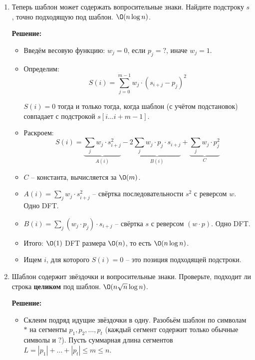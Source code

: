\begin{enumerate}
\begin{enumerate}
      \item
        Теперь шаблон может содержать вопросительные знаки. Найдите подстроку $s$,
        точно подходящую под шаблон. $\O(n \log{n})$.

        \textbf{Решение:}

        \begin{itemize}
          \item Введём весовую функцию: $w_j = 0$, если $p_j = {?}$, иначе $w_j = 1$.

          \item Определим:
          $$S(i) = \sum_{j=0}^{m-1} w_j \cdot (s_{i+j} - p_j)^2$$

          $S(i) = 0$ тогда и только тогда, когда шаблон (с учётом подстановок) совпадает с подстрокой $s[i \ldots i+m-1]$.

          \item Раскроем:
          $$S(i) = \underbrace{\sum_j w_j \cdot s_{i+j}^2}_{A(i)} - 2 \underbrace{\sum_j w_j \cdot p_j \cdot s_{i+j}}_{B(i)} + \underbrace{\sum_j w_j \cdot p_j^2}_{C}$$

          \item $C$ -- константа, вычисляется за $\O(m)$.

          \item $A(i) = \sum_j w_j \cdot s_{i+j}^2$ -- свёртка последовательности $s^2$ с реверсом $w$. Одно DFT.

          \item $B(i) = \sum_j (w_j \cdot p_j) \cdot s_{i+j}$ -- свёртка $s$ с реверсом $(w \cdot p)$. Одно DFT.

          \item Итого: $\O(1)$ DFT размера $\O(n)$, то есть $\O(n \log n)$.

          \item Ищем $i$, для которого $S(i) = 0$ -- это позиция подходящей подстроки.
        \end{itemize}

      \item
        Шаблон содержит звёздочки и вопросительные знаки. Проверьте,
        подходит ли строка \textbf{целиком} под шаблон. $\O(n \sqrt{n} \log{n})$.

        \textbf{Решение:}

        \begin{itemize}
          \item Склеим подряд идущие звёздочки в одну. Разобьём шаблон по символам ${*}$ на сегменты $p_1, p_2, \ldots, p_t$ (каждый сегмент содержит только обычные символы и ${?}$). Пусть суммарная длина сегментов $L = |p_1| + \ldots + |p_t| \leq m \leq n$.


\end{itemize}
\end{enumerate}
\end{enumerate}
